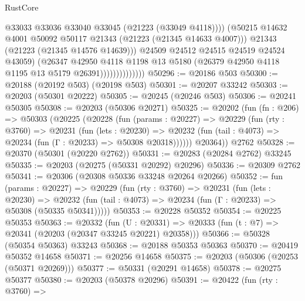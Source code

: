 \begin{lexlean}{RustCore}
\begin{coremodule}
                                    @33033
                                    @33036
                                    @33040
                                    @33045
                                    (@21223 (@33049 @4118))))
                                (@50215
                                  @14632
                                  @4001
                                  @50092
                                  @50117
                                  @21343
                                  (@21223 (@21345 @14633 @4007)))
                                @21343
                                (@21223 (@21345 @14576 @14639)))
                              @24509
                              @24512
                              @24515
                              @24519
                              @24524
                              @43059)
                            (@26347
                              @42950
                              @4118
                              @1198
                              @13
                              @5180
                              (@26379 @42950 @4118 @1195 @13 @5179 @26391))))))))))))))
@50296 := @20186 @503
@50300 := @20188 (@20192 @503) (@20198 @503)
@50301 := @20207 @33242
@50303 := @20203 (@50301 @20222)
@50305 := @20245 (@20246 @503)
@50306 := @20241 @50305
@50308 := @20203 (@50306 @20271)
@50325 := @20202
    (fun (fn : @206) =>
    @50303
      (@20225
        (@20228
          (fun (params : @20227) =>
          @20229
            (fun (rty : @3760) =>
            @20231
              (fun (lets : @20230) =>
              @20232 (fun (tail : @4073) => @20234 (fun (Γ : @20233) => @50308 @20318))))))
        @20364))
    @2762
@50328 := @20370 (@50301 (@20220 @2762))
@50331 := @20283 (@20284 @2762) @33245
@50335 := @20203 (@20275 (@50331 @20292) @20296)
@50336 := @20309 @2762
@50341 := @20306 (@20308 @50336 @33248 @20264 @20266)
@50352 := fun (params : @20227) =>
  @20229
    (fun (rty : @3760) =>
    @20231
      (fun (lets : @20230) =>
      @20232 (fun (tail : @4073) => @20234 (fun (Γ : @20233) => @50308 (@50335 @50341)))))
@50353 := @20228 @50352
@50354 := @20225 @50353
@50363 := @20332
    (fun (U : @20331) => @20333 (fun (t : @7) => @20341 (@20203 (@20347 @33245 @20221) @20358)))
@50366 := @50328 (@50354 @50363) @33243
@50368 := @20188 @50353 @50363
@50370 := @20419 @50352 @14658
@50371 := @20256 @14658
@50375 := @20203 (@50306 (@20253 (@50371 @20269)))
@50377 := @50331 (@20291 @14658)
@50378 := @20275 @50377
@50380 := @20203 (@50378 @20296)
@50391 := @20422
    (fun (rty : @3760) =>

\end{coremodule}
\end{lexlean}
